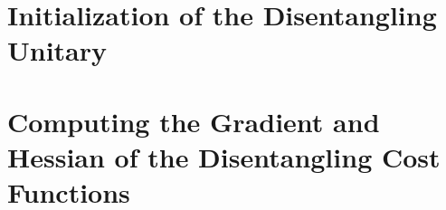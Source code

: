 \documentclass[encoding=utf8,british]{template/thesis}
\begin{document}
	\chapter{Initialization of the Disentangling Unitary}
	\label{app:initialization_of_disentangling_unitary}
	
	\chapter{Computing the Gradient and Hessian of the Disentangling Cost Functions}
	\label{app:computation_of_gradient_and_hvp_for_riemannian_optimization}
	
	
	
	\backmatter
	\printbibliography
	
\end{document}

